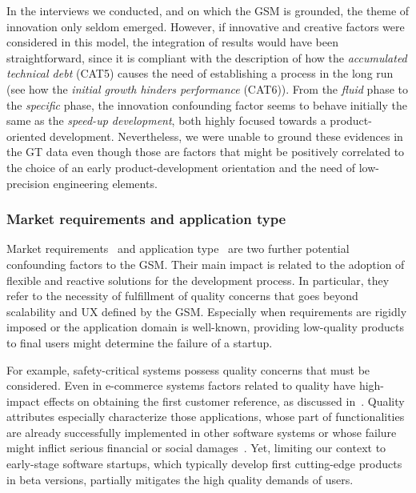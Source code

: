 \documentclass[10pt,journal,letterpaper,compsoc]{IEEEtran}
\begin{document}
In the interviews we conducted, and on which the GSM is grounded, the theme of
innovation only seldom emerged. However, if innovative and creative factors were
considered in this model, the integration of results would have been
straightforward, since it is compliant with the description of how the
\textit{accumulated technical debt} (CAT5) causes the need of establishing a
process in the long run (see how the \textit{initial growth hinders performance}
(CAT6)). %
From the \textit{fluid} phase to the \textit{specific} phase, the innovation 
confounding factor seems to behave initially the same as the \textit{speed-up 
development}, both highly focused towards a product-oriented development. 
Nevertheless, we were unable to ground these evidences in the GT data even 
though those are factors that might be positively correlated
to the choice of an early product-development orientation and the need of 
low-precision engineering elements.

\subsubsection{Market requirements and application type} 
Market requirements~\cite{Coleman2007} and application type~\cite{Sutton2000, 
Coleman2008,Coleman2008a} are two further potential confounding factors to the 
GSM. Their main impact is related to the adoption of flexible and reactive 
solutions for the development process. In particular, they refer to the 
necessity of fulfillment of quality concerns that goes beyond scalability and UX 
defined by the GSM. Especially when requirements are rigidly imposed or the 
application domain is well-known, providing low-quality products to final users 
might determine the failure of a startup.

For example, safety-critical systems possess quality concerns that must be
considered. Even in e-commerce systems factors related to quality have 
high-impact effects on obtaining the first customer reference, 
as discussed in~\cite{Deakins2005,Kim2005,Silva2005}. Quality attributes
especially %
characterize those applications, whose part of functionalities are already 
successfully implemented in other software systems or whose failure might 
inflict serious financial or social damages~\cite{Bass2003}. Yet, limiting our 
context to early-stage software startups, which typically develop first 
cutting-edge products in beta versions, partially mitigates the high quality 
demands of users.
\end{document}
